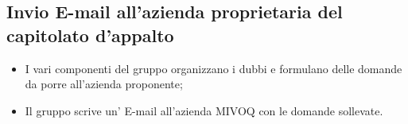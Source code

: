 \documentclass[11pt,a4paper]{article}
\begin{document}
	\subsection{Invio E-mail all'azienda proprietaria del capitolato d'appalto}
	\begin{itemize}
		\item I vari componenti del gruppo organizzano i dubbi e formulano delle domande da porre all'azienda proponente;
		\item Il gruppo scrive un' E-mail all'azienda MIVOQ con le domande sollevate.
	\end{itemize}
\end{document}
